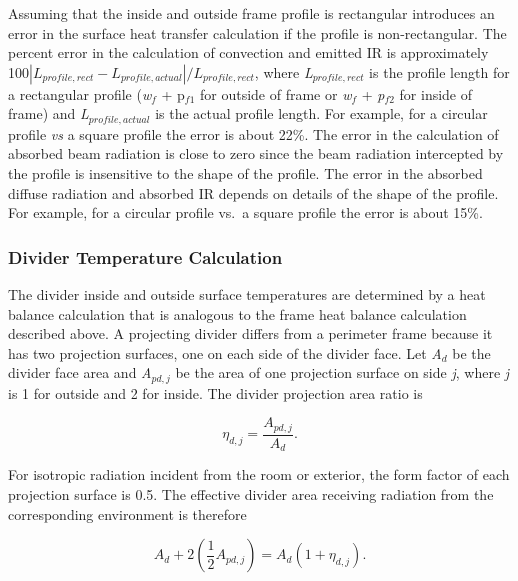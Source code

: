 Assuming that the inside and outside frame profile is rectangular introduces an error in the surface heat transfer calculation if the profile is non-rectangular. The percent error in the calculation of convection and emitted IR is approximately 100\(\left| {{L_{profile,rect}} - {L_{profile,actual}}} \right|/{L_{profile,rect}}\), where \emph{L\(_{profile,rect}\)} is the profile length for a rectangular profile (\emph{w\(_{f}\)} + p\(_{f1}\) for outside of frame or \emph{w\(_{f}\)} + \emph{p\(_{f2}\)} for inside of frame) and \emph{L\(_{profile,actual}\)} is the actual profile length. For example, for a circular profile \emph{vs} a square profile the error is about 22\%. The error in the calculation of absorbed beam radiation is close to zero since the beam radiation intercepted by the profile is insensitive to the shape of the profile. The error in the absorbed diffuse radiation and absorbed IR depends on details of the shape of the profile. For example, for a circular profile vs.~a square profile the error is about 15\%.

\subsubsection{Divider Temperature Calculation}\label{divider-temperature-calculation}

The divider inside and outside surface temperatures are determined by a heat balance calculation that is analogous to the frame heat balance calculation described above. A projecting divider differs from a perimeter frame because it has two projection surfaces, one on each side of the divider face. Let \emph{A\(_d\)} be the divider face area and \emph{A\(_{pd,j}\)} be the area of one projection surface on side \emph{j}, where \emph{j} is 1 for outside and 2 for inside. The divider projection area ratio is

\begin{equation}
{\eta_{d,j}} = \frac{{{A_{pd,j}}}}{{{A_d}}}.
\end{equation}

For isotropic radiation incident from the room or exterior, the form factor of each projection surface is 0.5. The effective divider area receiving radiation from the corresponding environment is therefore

\begin{equation}
{A_d} + 2\left( {\frac{1}{2}{A_{pd,j}}} \right) = {A_d}\left( {1 + {\eta_{d,j}}} \right).
\end{equation}

